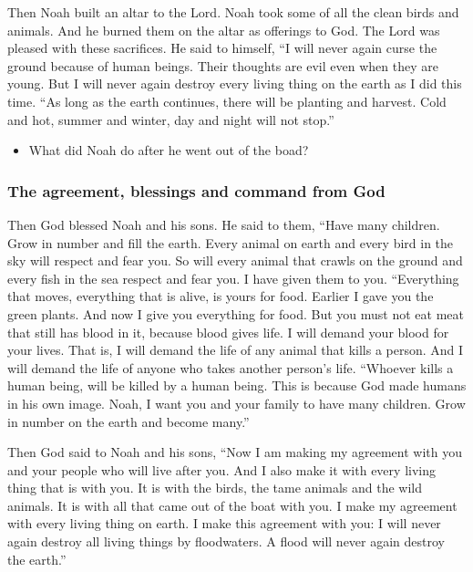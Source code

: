 Then Noah built an altar to the Lord. Noah took some of all the clean birds and animals. And he burned them on the altar as offerings to God. The Lord was pleased with these sacrifices. He said to himself, “I will never again curse the ground because of human beings. Their thoughts are evil even when they are young. But I will never again destroy every living thing on the earth as I did this time. “As long as the earth continues, there will be planting and harvest. Cold and hot, summer and winter, day and night will not stop.”

\begin{itemize}
\item What did Noah do after he went out of the boad?
\end{itemize}



\subsubsection{The agreement, blessings and command from God}

Then God blessed Noah and his sons. He said to them, “Have many children. Grow in number and fill the earth. Every animal on earth and every bird in the sky will respect and fear you. So will every animal that crawls on the ground and every fish in the sea respect and fear you. I have given them to you. “Everything that moves, everything that is alive, is yours for food. Earlier I gave you the green plants. And now I give you everything for food. But you must not eat meat that still has blood in it, because blood gives life. I will demand your blood for your lives. That is, I will demand the life of any animal that kills a person. And I will demand the life of anyone who takes another person’s life. “Whoever kills a human being, will be killed by a human being. This is because God made humans in his own image. Noah, I want you and your family to have many children. Grow in number on the earth and become many.”


Then God said to Noah and his sons, “Now I am making my agreement with you and your people who will live after you. And I also make it with every living thing that is with you. It is with the birds, the tame animals and the wild animals. It is with all that came out of the boat with you. I make my agreement with every living thing on earth. I make this agreement with you: I will never again destroy all living things by floodwaters. A flood will never again destroy the earth.”


